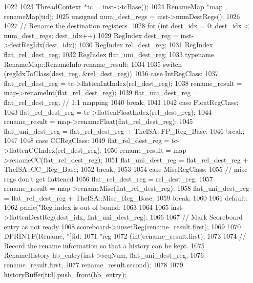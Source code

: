 \begin{DoxyCode}
1022 {
1023     ThreadContext *tc = inst->tcBase();
1024     RenameMap *map = renameMap[tid];
1025     unsigned num_dest_regs = inst->numDestRegs();
1026 
1027     // Rename the destination registers.
1028     for (int dest_idx = 0; dest_idx < num_dest_regs; dest_idx++) {
1029         RegIndex dest_reg = inst->destRegIdx(dest_idx);
1030         RegIndex rel_dest_reg;
1031         RegIndex flat_rel_dest_reg;
1032         RegIndex flat_uni_dest_reg;
1033         typename RenameMap::RenameInfo rename_result;
1034 
1035         switch (regIdxToClass(dest_reg, &rel_dest_reg)) {
1036           case IntRegClass:
1037             flat_rel_dest_reg = tc->flattenIntIndex(rel_dest_reg);
1038             rename_result = map->renameInt(flat_rel_dest_reg);
1039             flat_uni_dest_reg = flat_rel_dest_reg;  // 1:1 mapping
1040             break;
1041 
1042           case FloatRegClass:
1043             flat_rel_dest_reg = tc->flattenFloatIndex(rel_dest_reg);
1044             rename_result = map->renameFloat(flat_rel_dest_reg);
1045             flat_uni_dest_reg = flat_rel_dest_reg + TheISA::FP_Reg_Base;
1046             break;
1047 
1048           case CCRegClass:
1049             flat_rel_dest_reg = tc->flattenCCIndex(rel_dest_reg);
1050             rename_result = map->renameCC(flat_rel_dest_reg);
1051             flat_uni_dest_reg = flat_rel_dest_reg + TheISA::CC_Reg_Base;
1052             break;
1053 
1054           case MiscRegClass:
1055             // misc regs don't get flattened
1056             flat_rel_dest_reg = rel_dest_reg;
1057             rename_result = map->renameMisc(flat_rel_dest_reg);
1058             flat_uni_dest_reg = flat_rel_dest_reg + TheISA::Misc_Reg_Base;
1059             break;
1060 
1061           default:
1062             panic("Reg index is out of bound: %
1063         }
1064 
1065         inst->flattenDestReg(dest_idx, flat_uni_dest_reg);
1066 
1067         // Mark Scoreboard entry as not ready
1068         scoreboard->unsetReg(rename_result.first);
1069 
1070         DPRINTF(Rename, "[tid:%
1071                 "reg %
1072                 (int)rename_result.first);
1073 
1074         // Record the rename information so that a history can be kept.
1075         RenameHistory hb_entry(inst->seqNum, flat_uni_dest_reg,
1076                                rename_result.first,
1077                                rename_result.second);
1078 
1079         historyBuffer[tid].push_front(hb_entry);
}}
\end{DoxyCode}
